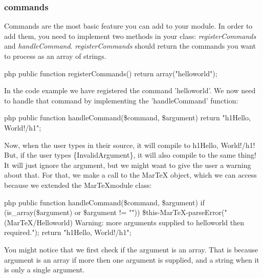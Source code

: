 \subsubsection{commands}
Commands are the most basic feature you can add to your module. In order to add them, you need to implement two methods in your class: \textit{registerCommands} and \textit{handleCommand}.
\textit{registerCommands} should return the commands you want to process as an array of strings.
\begin{code}{php}
public function registerCommands() {
  return array("helloworld");
}
\end{code}
In the code example we have registered the command 'helloworld'. We now need to handle that command by implementing the 'handleCommand' function:
\begin{code}{php}
public function handleCommand(\$command, \$argument) {
  return "\<h1\>Hello, World!\</h1\>";
}
\end{code}
Now, when the user types \backslashhelloworld in their source, it will compile to \<h1\>Hello, World!\</h1\>! But, if the user types \backslashhelloworld\{InvalidArgument\}, it will also
compile to the same thing! It will just ignore the argument, but we might want to give the user a warning about that. For that, we make a call to the MarTeX object, which we can
access because we extended the MarTeXmodule class:
\begin{code}{php}
public function handleCommand(\$command, \$argument) {
  if (is_array(\$argument) or \$argument != "")) {
    \$this-\>MarTeX-\>parseError("(MarTeX/Helloworld) Warning: more arguments supplied to helloworld then required.");
  }
  return "\<h1\>Hello, World!\</h1\>";
}
\end{code}
You might notice that we first check if the argument is an array. That is because argument is an array if more then one argument is supplied, and a string when it is only a single argument.




